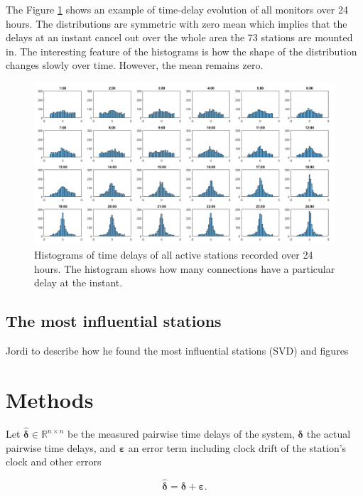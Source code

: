 \documentclass[12pt,a4paper,english]{article}
\begin{document}
The Figure \ref{fig:histograms} shows an example of time-delay evolution of all monitors over 24 hours. The distributions are symmetric with zero mean which implies that the delays at an instant cancel out over the whole area the 73 stations are mounted in. The interesting feature of the histograms is how the shape of the distribution changes slowly over time. However, the mean remains zero.

\begin{figure}[ht]
  \begin{center}   
   \includegraphics[width=\textwidth]{hourlydelaydistributionoverallstationsforoneday.png}
  \end{center}
  \caption{Histograms of time delays of all active stations recorded over 24 hours. The histogram shows how many connections have a particular delay at the instant.}\label{fig:histograms}
\end{figure}


\subsection{The most influential stations}

Jordi to describe how he found the most influential stations (SVD) and figures 

\section{Methods}

Let $\bm{\hat{\delta}} \in \mathbb{R}^{n\times n}$ be the measured pairwise time delays of the system, $\bm{\delta}$ the actual pairwise time delays, and $\bm{\varepsilon}$ an error term including clock drift of the station's clock and other errors

\begin{equation}
\bm{\hat{\delta}}  = \bm{\delta} + \bm{\varepsilon}.
\label{eq:model}
\end{equation}
 
\end{document}
